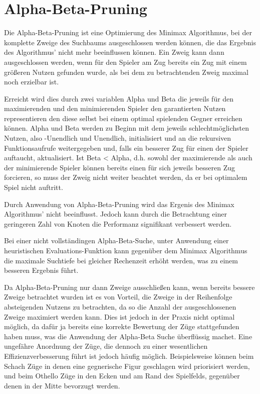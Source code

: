 \section{Alpha-Beta-Pruning}

Die Alpha-Beta-Pruning ist eine Optimierung des Minimax Algorithmus, bei der komplette Zweige des Suchbaums ausgeschlossen werden können, die das Ergebnis des Algorithmus' nicht mehr beeinflussen können.
Ein Zweig kann dann ausgeschlossen werden, wenn für den Spieler am Zug bereits ein Zug mit einem größeren Nutzen gefunden wurde, als bei dem zu betrachtenden Zweig maximal noch erzielbar ist.

Erreicht wird dies durch zwei variablen Alpha und Beta die jeweils für den maximierenden und den minimierenden Spieler den garantierten Nutzen representieren den diese selbst bei einem optimal spielenden Gegner
erreichen können. Alpha und Beta werden zu Beginn mit dem jeweils schlechtmöglichsten Nutzen, also -Unendlich und Unendlich, initialisiert und an die rekursiven Funktionsaufrufe weitergegeben und, falls ein besserer Zug
für einen der Spieler auftaucht, aktualisiert.
Ist Beta < Alpha, d.h. sowohl der maximierende als auch der minimierende Spieler können bereits einen für sich jeweils besseren Zug forcieren, so muss der Zweig nicht weiter beachtet werden, da er bei optimalem Spiel nicht auftritt.

Durch Anwendung von Alpha-Beta-Pruning wird das Ergenis des Minimax Algorithmus' nicht beeinflusst. Jedoch kann durch die Betrachtung einer geringeren Zahl von Knoten die Performanz signifikant verbessert werden.

Bei einer nicht vollständingen Alpha-Beta-Suche, unter Anwendung einer heuristischen Evaluations-Funktion kann gegenüber dem Minimax Algorithmus die maximale Suchtiefe bei gleicher Rechenzeit erhöht werden, was zu einem besseren Ergebnis führt.

Da Alpha-Beta-Pruning nur dann Zweige ausschließen kann, wenn bereits bessere Zweige betrachtet wurden ist es von Vorteil, die Zweige in der Reihenfolge absteigenden Nutzens zu betrachten, da so die Anzahl der ausgeschlossenen
Zweige maximiert werden kann.
Dies ist jedoch in der Praxis nicht optimal möglich, da dafür ja bereits eine korrekte Bewertung der Züge stattgefunden haben muss, was die Anwendung der Alpha-Beta Suche überflüssig machet.
Eine ungefähre Anordnung der Züge, die dennoch zu einer wesentlichen Effizienzverbesserung führt ist jedoch häufig möglich. Beispielsweise können beim Schach Züge in denen eine gegnerische Figur
geschlagen wird priorisiert werden, und beim Othello Züge in den Ecken und am Rand des Spielfelds, gegenüber denen in der Mitte bevorzugt werden.